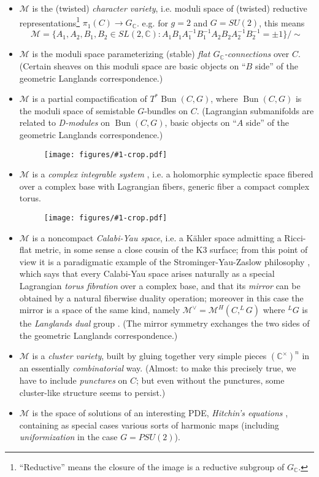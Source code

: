 \documentclass[12pt,letterpaper,reqno]{article}
\numberwithin{equation}{section}
\newcommand{\cM}{\ensuremath{\mathcal M}}
\newcommand{\C}{\ensuremath{\mathbb C}}
\newcommand{\kahler}{K\"ahler\xspace}
\newcommand{\ti}[1]{\textit{#1}}
\DeclareMathOperator{\Bun}{Bun}
\newcommand{\insfig}[2]{\begin{figure}[htbp] \centering \texttt{[image: figures/\#1-crop.pdf]} \label{fig:#1} \end{figure}}
\begin{document}
\begin{itemize}
\item $\cM$ is the (twisted) \ti{character variety}, i.e. moduli space of
(twisted) 
reductive representations\footnote{``Reductive'' means the closure of 
the image is a reductive subgroup of $G_\C$.}
$\pi_1(C) \to G_\C$.
e.g. for $g=2$ and $G = SU(2)$, 
this means
\begin{equation}
  \cM = \{ A_1,A_2,B_1,B_2 \in SL(2,\C): A_1 B_1 A_1^{-1} B_1^{-1} A_2 B_2 A_2^{-1} B_2^{-1} = \pm 1 \} / \sim
\end{equation}
\item $\cM$ is the moduli space parameterizing (stable) \ti{flat $G_\C$-connections}
over $C$. (Certain sheaves on this moduli space are 
basic objects on ``$B$ side'' of the geometric Langlands correspondence.)
\item $\cM$ is a partial compactification of $T^* \Bun(C,G)$, where $\Bun(C,G)$ is the moduli space of semistable $G$-bundles on $C$. (Lagrangian submanifolds are related to \ti{D-modules} on $\Bun(C,G)$, basic objects on ``$A$ side'' 
of the geometric Langlands correspondence.)
\insfig{higgs-bundles-2}{0.55}
\item $\cM$ is a \ti{complex integrable system} \cite{MR88i:58068}, i.e. a holomorphic
symplectic space fibered over a complex base with Lagrangian
fibers, generic fiber a compact complex torus. \insfig{higgs-bundles-1}{0.8}
\item $\cM$ is a noncompact \ti{Calabi-Yau space}, i.e. a \kahler
space admitting a Ricci-flat metric, in some sense a close 
cousin of the K3 surface; from this point of view
it is a paradigmatic example of the Strominger-Yau-Zaslow
philosophy \cite{Strominger:1996it}, 
which says that every Calabi-Yau space arises naturally
as a special Lagrangian \ti{torus fibration} over a complex base,
and that its \ti{mirror} can be obtained by a natural fiberwise duality
operation; moreover in this case the mirror is a space of the same kind,
namely $\cM^\vee = \cM^H(C,^L G)$ where 
$^L G$ is the \ti{Langlands dual} group \cite{mlh,MR2957305}.
(The mirror symmetry
exchanges the two sides of the geometric Langlands correspondence.)
\item $\cM$ is a \ti{cluster variety}, built by gluing together
very simple pieces $(\C^\times)^n$ in an essentially \ti{combinatorial} way. (Almost: to make this precisely true, we have to include \ti{punctures} on $C$; but even without the punctures, some cluster-like
structure seems to persist.)
\item $\cM$ is the space of solutions of an interesting PDE, \ti{Hitchin's equations} \cite{MR89a:32021}, containing as special cases various sorts of harmonic maps (including \ti{uniformization} in the case $G = PSU(2)$).
\end{itemize}
\end{document}
